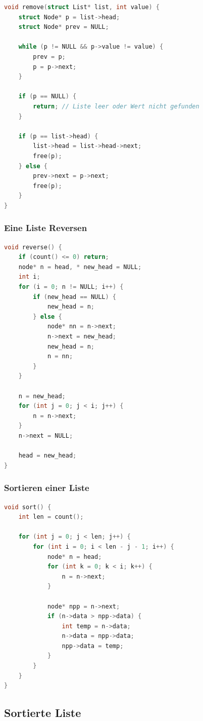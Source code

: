 \documentclass{article}
\begin{document}
\begin{lstlisting}[language=c, tabsize=4]
void remove(struct List* list, int value) {
    struct Node* p = list->head;
    struct Node* prev = NULL;
    
    while (p != NULL && p->value != value) {
        prev = p;
        p = p->next;
    }
    
    if (p == NULL) {
        return; // Liste leer oder Wert nicht gefunden
    }
    
    if (p == list->head) {
        list->head = list->head->next;
        free(p);
    } else {
        prev->next = p->next;
        free(p);
    }
}
\end{lstlisting}

\subsubsection{Eine Liste Reversen}

\begin{lstlisting}[language=c, tabsize=4]
void reverse() {
	if (count() <= 0) return;
	node* n = head, * new_head = NULL;
	int i;
	for (i = 0; n != NULL; i++) {
		if (new_head == NULL) {
			new_head = n;
		} else {
			node* nn = n->next;
			n->next = new_head;
			new_head = n;
			n = nn;
		}
	}

	n = new_head;
	for (int j = 0; j < i; j++) {
		n = n->next;
	}
	n->next = NULL;

	head = new_head;
}
\end{lstlisting}

\subsubsection{Sortieren einer Liste}

\begin{lstlisting}[language=c, tabsize=4]
void sort() {
	int len = count();

	for (int j = 0; j < len; j++) {
		for (int i = 0; i < len - j - 1; i++) {
			node* n = head;
			for (int k = 0; k < i; k++) { 
			    n = n->next; 
			}
			
			node* npp = n->next;
			if (n->data > npp->data) {
				int temp = n->data;
				n->data = npp->data;
				npp->data = temp;
			}
		}
	}
}
\end{lstlisting}
\newpage

\subsection{Sortierte Liste}
\end{document}
